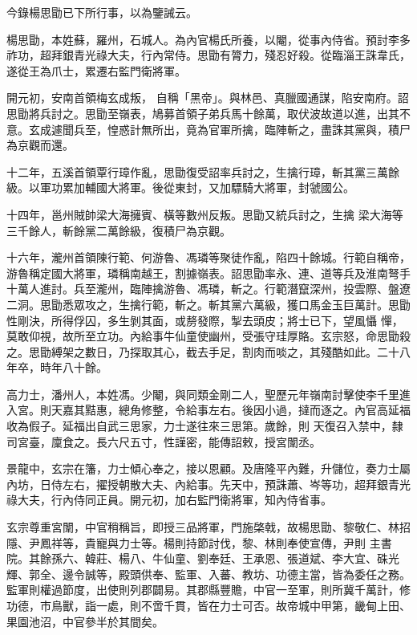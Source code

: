 \begin{pinyinscope}
 今錄楊思勖已下所行事，以為鑒誡云。



 楊思勖，本姓蘇，羅州，石城人。為內官楊氏所養，以閹，從事內侍省。預討李多祚功，超拜銀青光祿大夫，行內常侍。思勖有膂力，殘忍好殺。從臨淄王誅韋氏，遂從王為爪士，累遷右監門衛將軍。



 開元初，安南首領梅玄成叛，
 自稱「黑帝」。與林邑、真臘國通謀，陷安南府。詔思勖將兵討之。思勖至嶺表，鳩募首領子弟兵馬十餘萬，取伏波故道以進，出其不意。玄成遽聞兵至，惶惑計無所出，竟為官軍所擒，臨陣斬之，盡誅其黨與，積尸為京觀而還。



 十二年，五溪首領覃行璋作亂，思勖復受詔率兵討之，生擒行璋，斬其黨三萬餘級。以軍功累加輔國大將軍。後從東封，又加驃騎大將軍，封虢國公。



 十四年，邕州賊帥梁大海擁賓、橫等數州反叛。思勖又統兵討之，生擒
 梁大海等三千餘人，斬餘黨二萬餘級，復積尸為京觀。



 十六年，瀧州首領陳行範、何游魯、馮璘等聚徒作亂，陷四十餘城。行範自稱帝，游魯稱定國大將軍，璘稱南越王，割據嶺表。詔思勖率永、連、道等兵及淮南弩手十萬人進討。兵至瀧州，臨陣擒游魯、馮璘，斬之。行範潛竄深州，投雲際、盤遼二洞。思勖悉眾攻之，生擒行範，斬之。斬其黨六萬級，獲口馬金玉巨萬計。思勖性剛決，所得俘囚，多生剝其面，或剺發際，掣去頭皮；將士已下，望風懾
 憚，莫敢仰視，故所至立功。內給事牛仙童使幽州，受張守珪厚賂。玄宗怒，命思勖殺之。思勖縛架之數日，乃探取其心，截去手足，割肉而啖之，其殘酷如此。二十八年卒，時年八十餘。



 高力士，潘州人，本姓馮。少閹，與同類金剛二人，聖歷元年嶺南討擊使李千里進入宮。則天嘉其黠惠，總角修整，令給事左右。後因小過，撻而逐之。內官高延福收為假子。延福出自武三思家，力士遂往來三思第。歲餘，則
 天復召入禁中，隸司宮臺，廩食之。長六尺五寸，性謹密，能傳詔敕，授宮闈丞。



 景龍中，玄宗在籓，力士傾心奉之，接以恩顧。及唐隆平內難，升儲位，奏力士屬內坊，日侍左右，擢授朝散大夫、內給事。先天中，預誅蕭、岑等功，超拜銀青光祿大夫，行內侍同正員。開元初，加右監門衛將軍，知內侍省事。



 玄宗尊重宮闈，中官稍稱旨，即授三品將軍，門施棨戟，故楊思勖、黎敬仁、林招隱、尹鳳祥等，貴寵與力士等。楊則持節討伐，黎、林則奉使宣傳，尹則
 主書院。其餘孫六、韓莊、楊八、牛仙童、劉奉廷、王承恩、張道斌、李大宜、硃光輝、郭全、邊令誠等，殿頭供奉、監軍、入蕃、教坊、功德主當，皆為委任之務。監軍則權過節度，出使則列郡闢易。其郡縣豐贍，中官一至軍，則所冀千萬計，修功德，市鳥獸，詣一處，則不啻千貫，皆在力士可否。故帝城中甲第，畿甸上田、果園池沼，中官參半於其間矣。




\end{pinyinscope}
